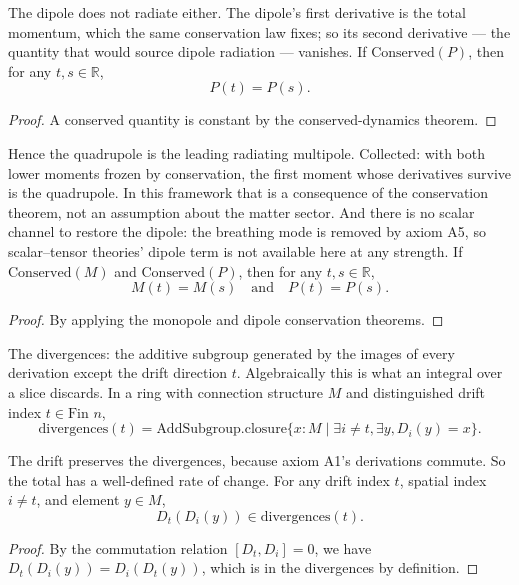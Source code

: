 \begin{theorem}
The dipole does not radiate either. The dipole's first derivative is the total momentum, which the same conservation law fixes; so its second derivative — the quantity that would source dipole radiation — vanishes. If $\text{Conserved}(P)$, then for any $t, s \in \mathbb{R}$,
\[
P(t) = P(s).
\]
\begin{proof}
A conserved quantity is constant by the conserved-dynamics theorem.
\end{proof}
\end{theorem}

\begin{theorem}
Hence the quadrupole is the leading radiating multipole. Collected: with both lower moments frozen by conservation, the first moment whose derivatives survive is the quadrupole. In this framework that is a consequence of the conservation theorem, not an assumption about the matter sector. And there is no scalar channel to restore the dipole: the breathing mode is removed by axiom A5, so scalar–tensor theories' dipole term is not available here at any strength. If $\text{Conserved}(M)$ and $\text{Conserved}(P)$, then for any $t, s \in \mathbb{R}$,
\[
M(t) = M(s) \quad \text{and} \quad P(t) = P(s).
\]
\begin{proof}
By applying the monopole and dipole conservation theorems.
\end{proof}
\end{theorem}

\begin{definition}
The divergences: the additive subgroup generated by the images of every derivation except the drift direction $t$. Algebraically this is what an integral over a slice discards. In a ring with connection structure $M$ and distinguished drift index $t \in \text{Fin } n$,
\[
\text{divergences}(t) = \text{AddSubgroup.closure}\{x : M \mid \exists i \neq t, \exists y, D_i(y) = x\}.
\]
\end{definition}

\begin{theorem}
The drift preserves the divergences, because axiom A1's derivations commute. So the total has a well-defined rate of change. For any drift index $t$, spatial index $i \neq t$, and element $y \in M$,
\[
D_t(D_i(y)) \in \text{divergences}(t).
\]
\begin{proof}
By the commutation relation $[D_t, D_i] = 0$, we have $D_t(D_i(y)) = D_i(D_t(y))$, which is in the divergences by definition.
\end{proof}
\end{theorem}

